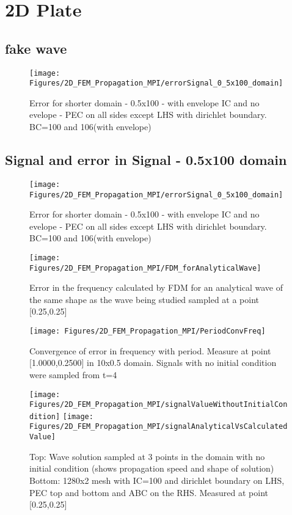 
\chapter{2D Plate} %

\section{fake wave}

\begin{figure}
\texttt{[image: Figures/2D\_FEM\_Propagation\_MPI/errorSignal\_0\_5x100\_domain]}
\caption{Error for shorter domain - 0.5x100 - with envelope IC and no evelope - PEC on all sides except LHS with dirichlet boundary. BC=100 and 106(with envelope)}
\end{figure}

\section{Signal and error in Signal - 0.5x100 domain}

\begin{figure}
\texttt{[image: Figures/2D\_FEM\_Propagation\_MPI/errorSignal\_0\_5x100\_domain]}
\caption{Error for shorter domain - 0.5x100 - with envelope IC and no evelope - PEC on all sides except LHS with dirichlet boundary. BC=100 and 106(with envelope)}
\end{figure}

\begin{figure}
\texttt{[image: Figures/2D\_FEM\_Propagation\_MPI/FDM\_forAnalyticalWave]}
\caption{Error in the frequency calculated by FDM for an analytical wave of the same shape as the wave being studied sampled at a point [0.25,0.25]}
\end{figure}

\begin{figure}
\texttt{[image: Figures/2D\_FEM\_Propagation\_MPI/PeriodConvFreq]}
\caption{Convergence of error in frequency with period. Measure at point [1.0000,0.2500] in 10x0.5 domain. Signals with no initial condition were sampled from t=4}
\end{figure}

\begin{figure}
\texttt{[image: Figures/2D\_FEM\_Propagation\_MPI/signalValueWithoutInitialCondition]}
\texttt{[image: Figures/2D\_FEM\_Propagation\_MPI/signalAnalyticalVsCalculatedValue]}
\caption{Top: Wave solution sampled at 3 points in the domain with no initial condition (shows propagation speed and shape of solution) Bottom: 1280x2 mesh with IC=100 and dirichlet boundary on LHS, PEC top and bottom and ABC on the RHS. Measured at point [0.25,0.25] }
\end{figure}

